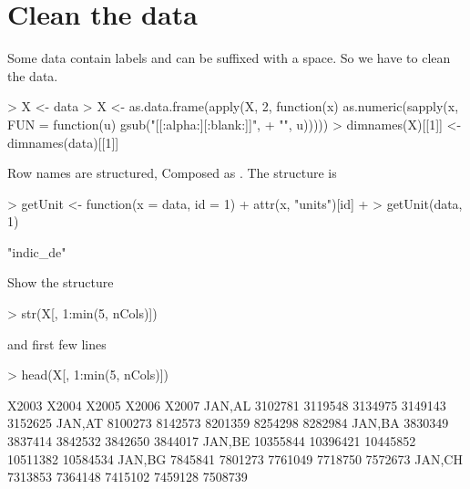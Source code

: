 \documentclass[a4paper,12pt]{article}\usepackage[]{graphicx}\usepackage[]{color}
\begin{document}
\section{Clean the data}

Some data contain labels and can be suffixed with a space. So we have to clean the data.

\begin{Schunk}
\begin{Sinput}
> X <- data
> X <- as.data.frame(apply(X, 2, function(x) as.numeric(sapply(x, FUN = function(u) gsub("[[:alpha:][:blank:]]", 
+     "", u)))))
> dimnames(X)[[1]] <- dimnames(data)[[1]]
\end{Sinput}
\end{Schunk}

Row names are structured, Composed as .
The structure is

\begin{Schunk}
\begin{Sinput}
> getUnit <- function(x = data, id = 1) {
+     attr(x, "units")[id]
+ }
> getUnit(data, 1)
\end{Sinput}
\begin{Soutput}
[1] "indic_de"
\end{Soutput}
\end{Schunk}


Show the structure
\begin{Schunk}
\begin{Sinput}
> str(X[, 1:min(5, nCols)])
\end{Sinput}
\end{Schunk}

and first few lines

\begin{Schunk}
\begin{Sinput}
> head(X[, 1:min(5, nCols)])
\end{Sinput}
\begin{Soutput}
          X2003    X2004    X2005    X2006    X2007
JAN,AL  3102781  3119548  3134975  3149143  3152625
JAN,AT  8100273  8142573  8201359  8254298  8282984
JAN,BA  3830349  3837414  3842532  3842650  3844017
JAN,BE 10355844 10396421 10445852 10511382 10584534
JAN,BG  7845841  7801273  7761049  7718750  7572673
JAN,CH  7313853  7364148  7415102  7459128  7508739
\end{Soutput}
\end{Schunk}
\end{document}
